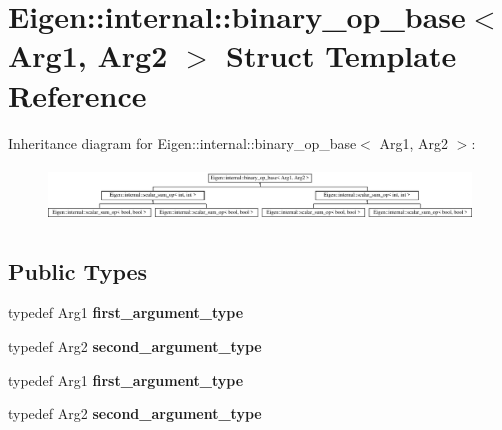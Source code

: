\hypertarget{struct_eigen_1_1internal_1_1binary__op__base}{}\section{Eigen\+:\+:internal\+:\+:binary\+\_\+op\+\_\+base$<$ Arg1, Arg2 $>$ Struct Template Reference}
\label{struct_eigen_1_1internal_1_1binary__op__base}
Inheritance diagram for Eigen\+:\+:internal\+:\+:binary\+\_\+op\+\_\+base$<$ Arg1, Arg2 $>$\+:\begin{figure}[H]
\begin{center}
\leavevmode
\includegraphics[height=1.468531cm]{struct_eigen_1_1internal_1_1binary__op__base}
\end{center}
\end{figure}
\subsection*{Public Types}
\begin{DoxyCompactItemize}
\item 
\mbox{\label{struct_eigen_1_1internal_1_1binary__op__base_a83c1997b82c31cf8b003232445cbdcf2}} 
typedef Arg1 {\bfseries first\+\_\+argument\+\_\+type}
\item 
\mbox{\label{struct_eigen_1_1internal_1_1binary__op__base_abd943c603b3b6ff7c304ec1326b4eb53}} 
typedef Arg2 {\bfseries second\+\_\+argument\+\_\+type}
\item 
\mbox{\label{struct_eigen_1_1internal_1_1binary__op__base_a83c1997b82c31cf8b003232445cbdcf2}} 
typedef Arg1 {\bfseries first\+\_\+argument\+\_\+type}
\item 
\mbox{\label{struct_eigen_1_1internal_1_1binary__op__base_abd943c603b3b6ff7c304ec1326b4eb53}} 
typedef Arg2 {\bfseries second\+\_\+argument\+\_\+type}
\end{DoxyCompactItemize}


